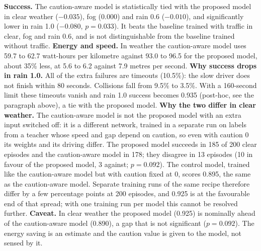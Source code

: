 \begin{implicationbox}
\textbf{Success.} The caution-aware model is statistically tied with the proposed model in clear weather ($-0.035$), fog ($0.000$) and rain 0.6 ($-0.010$), and significantly lower in rain 1.0 ($-0.080$, $p=0.033$). It beats the baseline trained with traffic in clear, fog and rain 0.6, and is not distinguishable from the baseline trained without traffic.
\textbf{Energy and speed.} In weather the caution-aware model uses 59.7 to 62.7 watt-hours per kilometre against 93.0 to 96.5 for the proposed model, about 35\% less, at 5.6 to 6.2 against 7.9 metres per second.
\textbf{Why success drops in rain 1.0.} All of the extra failures are timeouts (10.5\%): the slow driver does not finish within 80 seconds. Collisions fall from 9.5\% to 3.5\%. With a 160-second limit these timeouts vanish and rain 1.0 success becomes 0.935 (post-hoc, see the paragraph above), a tie with the proposed model.
\textbf{Why the two differ in clear weather.} The caution-aware model is not the proposed model with an extra input switched off: it is a different network, trained in a separate run on labels from a teacher whose speed and gap depend on caution, so even with caution 0 its weights and its driving differ. The proposed model succeeds in 185 of 200 clear episodes and the caution-aware model in 178; they disagree in 13 episodes (10 in favour of the proposed model, 3 against; $p=0.092$). The control model, trained like the caution-aware model but with caution fixed at 0, scores 0.895, the same as the caution-aware model. Separate training runs of the same recipe therefore differ by a few percentage points at 200 episodes, and 0.925 is at the favourable end of that spread; with one training run per model this cannot be resolved further.
\textbf{Caveat.} In clear weather the proposed model (0.925) is nominally ahead of the caution-aware model (0.890), a gap that is not significant ($p=0.092$). The energy saving is an estimate and the caution value is given to the model, not sensed by it.
\end{implicationbox}
